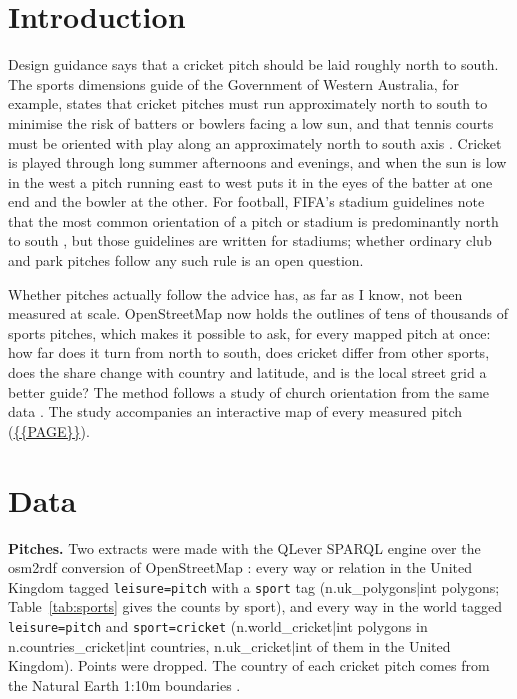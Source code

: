 \documentclass[11pt,a4paper]{article}
\begin{document}
\section{Introduction}
Design guidance says that a cricket pitch should be laid roughly north to south. The sports dimensions guide of the Government of Western Australia, for example, states that cricket pitches must run approximately north to south to minimise the risk of batters or bowlers facing a low sun, and that tennis courts must be oriented with play along an approximately north to south axis \citep{wa}. Cricket is played through long summer afternoons and evenings, and when the sun is low in the west a pitch running east to west puts it in the eyes of the batter at one end and the bowler at the other. For football, FIFA's stadium guidelines note that the most common orientation of a pitch or stadium is predominantly north to south \citep{fifa}, but those guidelines are written for stadiums; whether ordinary club and park pitches follow any such rule is an open question.

Whether pitches actually follow the advice has, as far as I know, not been measured at scale. OpenStreetMap \citep{osm} now holds the outlines of tens of thousands of sports pitches, which makes it possible to ask, for every mapped pitch at once: how far does it turn from north to south, does cricket differ from other sports, does the share change with country and latitude, and is the local street grid a better guide? The method follows a study of church orientation from the same data \citep{churches}. The study accompanies an interactive map of every measured pitch (\url{{{PAGE}}}).

\section{Data}
\textbf{Pitches.} Two extracts were made with the QLever SPARQL engine \citep{qlever} over the osm2rdf conversion of OpenStreetMap \citep{osm2rdf}: every way or relation in the United Kingdom tagged \texttt{leisure=pitch} with a \texttt{sport} tag ({{n.uk_polygons|int}} polygons; Table~\ref{tab:sports} gives the counts by sport), and every way in the world tagged \texttt{leisure=pitch} and \texttt{sport=cricket} ({{n.world_cricket|int}} polygons in {{n.countries_cricket|int}} countries, {{n.uk_cricket|int}} of them in the United Kingdom). Points were dropped. The country of each cricket pitch comes from the Natural Earth 1:10m boundaries \citep{ne}.
\end{document}
